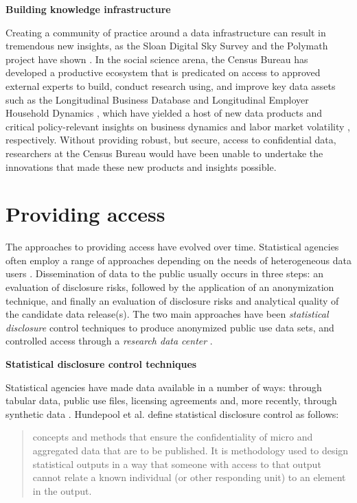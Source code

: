 \documentclass[]{krantz}
\begin{document}
\textbf{Building knowledge infrastructure}

Creating a community of practice around a data infrastructure can result
in tremendous new insights, as the Sloan Digital Sky Survey and the
Polymath project have shown \citep{nielsen2012reinventing}. In the
social science arena, the Census Bureau has developed a productive
ecosystem that is predicated on access to approved external experts to
build, conduct research using, and improve key data assets such as the
Longitudinal Business Database \citep{jarmin2002longitudinal} and
Longitudinal Employer Household Dynamics \citep{abowd2004integrated},
which have yielded a host of new data products and critical
policy-relevant insights on business dynamics
\citep{haltiwanger2013creates} and labor market volatility
\citep{brown2008economic}, respectively. Without providing robust, but
secure, access to confidential data, researchers at the Census Bureau
would have been unable to undertake the innovations that made these new
products and insights possible.

\section{Providing access}\label{providing-access}

The approaches to providing access have evolved over time. Statistical
agencies often employ a range of approaches depending on the needs of
heterogeneous data users
\citep{doyle2001confidentiality, foster2009resolving}. Dissemination of
data to the public usually occurs in three steps: an evaluation of
disclosure risks, followed by the application of an anonymization
technique, and finally an evaluation of disclosure risks and analytical
quality of the candidate data release(s). The two main approaches have
been \emph{statistical disclosure} control techniques to produce
anonymized public use data sets, and controlled access through a
\emph{research data center} \citep{shlomo2018}.

\textbf{Statistical disclosure control techniques}

Statistical agencies have made data available in a number of ways:
through tabular data, public use files, licensing agreements and, more
recently, through synthetic data \citep{reiter2012statistical}.
Hundepool et al. \citep{hundepool2010handbook} define statistical
disclosure control as follows:

\begin{quote}
concepts and methods that ensure the confidentiality of micro and
aggregated data that are to be published. It is methodology used to
design statistical outputs in a way that someone with access to that
output cannot relate a known individual (or other responding unit) to an
element in the output.
\end{quote}
\end{document}
